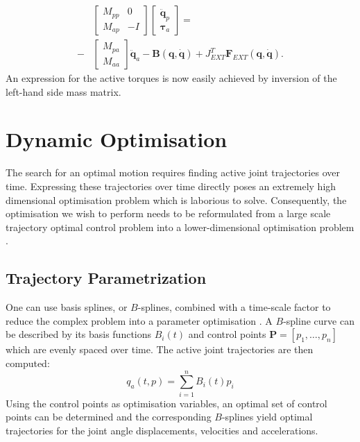 \documentclass[letterpaper, 10 pt, conference]{ieeeconf}  %
\begin{document}
\begin{equation}
\begin{aligned}
&\left[\begin{array}{cc}  
M_{pp} & 0\\
M_{ap} &-I
\end{array} \right]
\left[\begin{array}{c}  
\mathbf{\ddot q}_p\\
\boldsymbol{\tau}_a
\end{array} \right] =\\ 
-&
\left[\begin{array}{c}  
M_{pa}\\
M_{aa}
\end{array} \right] 
\mathbf{\ddot q}_a-
\mathbf{B(q, \dot q)}+
J_{EXT}^T\mathbf{F}_{EXT}\mathbf{(q, \dot q)}.
\end{aligned}
\end{equation}	
An expression for the active torques is now easily achieved by inversion of the left-hand side mass matrix. 

\section{Dynamic Optimisation} \label{sec:dynamicOptimisation}

The search for an optimal motion requires finding active joint trajectories over time. Expressing these trajectories over time directly poses an extremely high dimensional optimisation problem which is laborious to solve. Consequently, the optimisation we wish to perform needs to be reformulated from a large scale trajectory optimal control problem into a lower-dimensional optimisation problem \cite{kaphle2008optimality}.


\subsection{Trajectory Parametrization}

One can use basis splines, or $B$-splines, combined with a time-scale factor to reduce the complex problem into a parameter optimisation \cite{ude2000planning,babivc2009biarticulated,wang1999weight,albro2001optimal}. A $B$-spline curve can be described by its basis functions $B_i(t)$ and control points $\mathbf{P}=\left[p_1,\dots,p_n\right]$ which are evenly spaced over time. The active joint trajectories are then computed:   
 \begin{equation}
q_a(t,p) = \sum_{i=1}^{n} B_i (t) p_i
\end{equation}
Using the control points as optimisation variables, an optimal set of control points can be determined and the corresponding $B$-splines yield optimal trajectories for the joint angle displacements, velocities and accelerations. 
\end{document}
